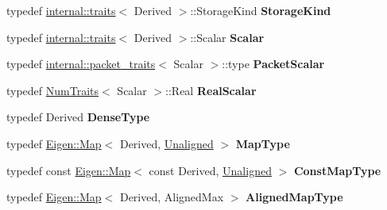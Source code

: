 \begin{DoxyCompactItemize}
typedef \hyperlink{struct_eigen_1_1internal_1_1traits}{internal\+::traits}$<$ Derived $>$\+::Storage\+Kind {\bfseries Storage\+Kind}
\item 
\mbox{\label{class_eigen_1_1_plain_object_base_a7f978b0b6cad676c9d01c2840f8113f5}} 
typedef \hyperlink{struct_eigen_1_1internal_1_1traits}{internal\+::traits}$<$ Derived $>$\+::Scalar {\bfseries Scalar}
\item 
\mbox{\label{class_eigen_1_1_plain_object_base_a2ebcc910069dac4c4562e28db3893250}} 
typedef \hyperlink{struct_eigen_1_1internal_1_1packet__traits}{internal\+::packet\+\_\+traits}$<$ Scalar $>$\+::type {\bfseries Packet\+Scalar}
\item 
\mbox{\label{class_eigen_1_1_plain_object_base_a48b2ce86692c75e066c80845b92798fc}} 
typedef \hyperlink{group___core___module_struct_eigen_1_1_num_traits}{Num\+Traits}$<$ Scalar $>$\+::Real {\bfseries Real\+Scalar}
\item 
\mbox{\label{class_eigen_1_1_plain_object_base_ac25403c3532dd011b8c0b490e5a2cfdc}} 
typedef Derived {\bfseries Dense\+Type}
\item 
\mbox{\label{class_eigen_1_1_plain_object_base_a079675be675be515402f37c3d73f7daf}} 
typedef \hyperlink{group___core___module_class_eigen_1_1_map}{Eigen\+::\+Map}$<$ Derived, \hyperlink{group__enums_gga45fe06e29902b7a2773de05ba27b47a1ac935220b4c844108e183ebe30a4d5204}{Unaligned} $>$ {\bfseries Map\+Type}
\item 
\mbox{\label{class_eigen_1_1_plain_object_base_af97b8d1ff458c804698bde148f03aa88}} 
typedef const \hyperlink{group___core___module_class_eigen_1_1_map}{Eigen\+::\+Map}$<$ const Derived, \hyperlink{group__enums_gga45fe06e29902b7a2773de05ba27b47a1ac935220b4c844108e183ebe30a4d5204}{Unaligned} $>$ {\bfseries Const\+Map\+Type}
\item 
\mbox{\label{class_eigen_1_1_plain_object_base_a0cc4ed7303f5f15f28b6ef0347931618}} 
typedef \hyperlink{group___core___module_class_eigen_1_1_map}{Eigen\+::\+Map}$<$ Derived, Aligned\+Max $>$ {\bfseries Aligned\+Map\+Type}

\end{DoxyCompactItemize}
